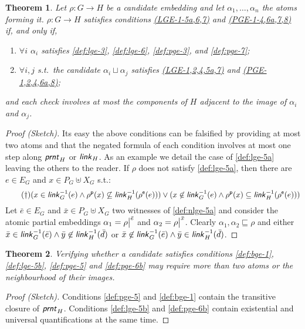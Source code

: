 \documentclass[a4paper,english,10pt]{article}
\theoremstyle{plain}\newtheorem{theorem}{Theorem}
\theoremstyle{plain}\newtheorem{corollary}[theorem]{Corollary}
\theoremstyle{plain}\newtheorem{proposition}[theorem]{Proposition}
\theoremstyle{plain}\newtheorem{lemma}[theorem]{Lemma}
\theoremstyle{plain}\newtheorem{definition}{Definition}
\theoremstyle{plain}\newtheorem{remark}{Remark}
\theoremstyle{plain}\newtheorem{example}[remark]{Example}
\newcommand{\?}[1]{}
\newcommand{\prnt}{\textsf{\textit{prnt}}}
\newcommand{\link}{\textsf{\textit{link}}}
\newcommand{\esf}[2]{#1^\mathsf{#2}}
\newcommand\corestr[2]{{\left.\kern-\nulldelimiterspace#1\vphantom{\big|}\right|^{#2}}}
\begin{document}
\begin{theorem}\label{thm:small-checks}
	Let $\rho : G \to H$ be a candidate embedding and let
	$\alpha_1, \dots, \alpha_n$ the atoms forming it.
	$\rho : G \to H$ satisfies conditions
	\hyperref[def:lge]{(LGE-1-5a,6,7)} and \hyperref[def:pge]{(PGE-1-4,6a,7,8)}
	if, and only if,
        \vspace{-1ex}
	\begin{enumerate}[label=\em(\alph*)]\itemsep=0pt
		\item
			$\forall i$ $\alpha_i$ satisfies
			\ref{def:lge-3}, \ref{def:lge-6},
			\ref{def:pge-3}, and \ref{def:pge-7};
		\item
			$\forall i,j$ s.t.~the candidate $\alpha_i \sqcup \alpha_j$ 
			satisfies \hyperref[def:lge]{(LGE-1,2,4,5a,7)} and \hyperref[def:pge]{(PGE-1,2,4,6a,8)};
        \vspace{-1ex}
	\end{enumerate}
	and each check involves at most the components of $H$ adjacent
	to the image of $\alpha_i$ and $\alpha_j$.
\end{theorem}
\begin{proof}[Proof (Sketch)]
	Its easy the above conditions can be falsified by providing at most
	two atoms and that the negated formula of each condition involves
	at most one step along $\prnt_H$ or $\link_H$. As an example we detail 
	the case of \ref{def:lge-5a} leaving the others to the reader.
	If $\rho$ does not satisfy \ref{def:lge-5a}, then there are $e \in E_G$ 
	and $x \in P_G \uplus X_G$ s.t.:
	\begin{equation}\tag{$\dagger$}\label{def:nlge-5a}
		(x \in \link^{-1}_G(e) \land 
		\esf{\rho}{p}(x)\not\subseteq 
		\link^{-1}_H(\esf{\rho}{e}(e))) \lor (x \not\in \link^{-1}_G(e) \land \esf{\rho}{p}(x)\subseteq \link^{-1}_H(\esf{\rho}{e}(e)))
	\end{equation}
	Let $\bar{e} \in E_G$ and $\bar{x} \in P_G \uplus X_G$ two witnesses 
	of \eqref{def:nlge-5a} and consider the atomic partial embeddings 
	$\alpha_1 = \corestr{\rho}{\bar e}$ and $\alpha_2 = \corestr{\rho}{\bar x}$.
	Clearly $\alpha_1, \alpha_2 \sqsubseteq \rho$ and either
	$\bar{x} \in \link^{-1}_G(\bar{e}) \land \bar{y} \not\in 
	\link^{-1}_H(\bar{d})$ or $\bar{x} \not\in \link^{-1}_G(\bar{e})
	\land \bar{y} \in \link^{-1}_H(\bar{d})$.
\end{proof}

\begin{theorem}\label{thm:big-checks}
	Verifying whether a candidate satisfies conditions 
	\ref{def:bge-1}, \ref{def:lge-5b}, \ref{def:pge-5} and \ref{def:pge-6b}
	may require more than two atoms	or the neighbourhood of their images.
\end{theorem}
\begin{proof}[Proof (Sketch)]
	Conditions \ref{def:pge-5} and \ref{def:bge-1} contain the transitive closure of $\prnt_H$.
	Conditions \ref{def:lge-5b} and \ref{def:pge-6b}
	contain existential and universal quantifications at the same time.
\end{proof}
\end{document}
